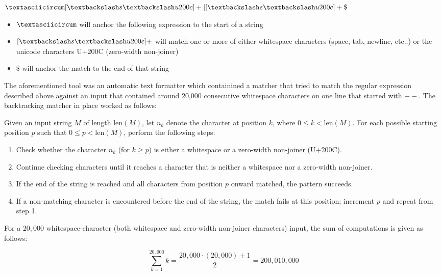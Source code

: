 \begin{center}
	$\textasciicircum [ \textbackslash s \textbackslash u200c]+|[ \textbackslash s \textbackslash u200c]+\$$
\end{center}

\begin{itemize}
	\item \textbf{$\textasciicircum$} will anchor the following expression to the start of a string
	\item \textbf{$[ \textbackslash s \textbackslash u200c]+$} will match one or more of either whitespace characters (space, tab, newline, etc..) or the unicode characters U+200C (zero-width non-joiner)
	\item \textbf{$\$$} will anchor the match to the end of that string
\end{itemize}


The aforementioned tool was an automatic text formatter which containined a matcher that tried to match the regular expression described above against an input that contained around 20,000 consecutive whitespace characters on one line that started with $--$.
The backtracking matcher in place worked as follows:

Given an input string $M$ of length $\text{len}(M)$, let $n_k$ denote the character at position $k$, where $0 \leq k < \text{len}(M)$. For each possible starting position $p$ such that $0 \leq p < \text{len}(M)$, perform the following steps:

\begin{enumerate}
	\item Check whether the character $n_k$ (for $k \geq p$) is either a whitespace or a zero-width non-joiner (U+200C).
	\item Continue checking characters until it reaches a character that is neither a whitespace nor a zero-width non-joiner.
	\item If the end of the string is reached and all characters from position $p$ onward matched, the pattern succeeds.
	\item If a non-matching character is encountered before the end of the string, the match fails at this position; increment $p$ and repeat from step 1.
\end{enumerate}

For a $20{,}000$ whitespace-character (both whitespace and zero-width non-joiner characters) input, the sum of computations is given as follows:

\begin{center}
	\[ \sum_{k=1}^{20,000} k = \frac{20,000 \cdot (20,000) + 1}{2} = 200,010,000 \]
\end{center}

